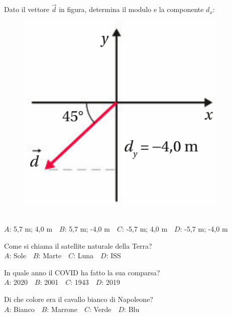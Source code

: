 \mcquestionheader Dato il vettore $\vec{d}$ in figura, determina il modulo e la componente $d_x$: \begin{figure}[h!]   \begin{center}     \includegraphics[scale=0.35]{vettored.png}   \end{center} \end{figure}\\
{$A$}: 5,7 m; 4,0 m\ \ {$B$}: 5,7 m; -4,0 m\ \ {$C$}: -5,7 m; 4,0 m\ \ {$D$}: -5,7 m; -4,0 m\ \ 

\mcquestionfooter



\def\mcquestionnumber{8}


\mcquestionheader Come si chiama il satellite naturale della Terra?\\
{$A$}: Sole\ \ {$B$}: Marte\ \ {$C$}: Luna\ \ {$D$}: ISS\ \ 

\mcquestionfooter



\def\mcquestionnumber{9}


\mcquestionheader In quale anno il COVID ha fatto la sua comparsa?\\
{$A$}: 2020\ \ {$B$}: 2001\ \ {$C$}: 1943\ \ {$D$}: 2019\ \ 

\mcquestionfooter



\def\mcquestionnumber{10}


\mcquestionheader Di che colore era il cavallo bianco di Napoleone?\\
{$A$}: Bianco\ \ {$B$}: Marrone\ \ {$C$}: Verde\ \ {$D$}: Blu\ \ 

\mcquestionfooter



